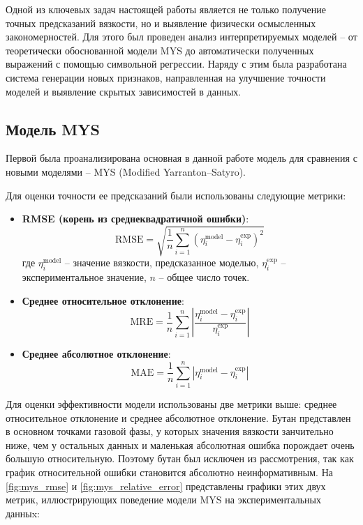 \documentclass[a4paper,12pt]{article}
\begin{document}
  Одной из ключевых задач настоящей работы является не только получение точных предсказаний вязкости, но и выявление физически осмысленных закономерностей. Для этого был проведен анализ интерпретируемых моделей -- от теоретически обоснованной модели MYS до автоматически полученных выражений с помощью символьной регрессии. Наряду с этим была разработана система генерации новых признаков, направленная на улучшение точности моделей и выявление скрытых зависимостей в данных.

  \subsection{Модель MYS}

    Первой была проанализирована основная в данной работе модель для сравнения с новыми моделями -- MYS (Modified Yarranton–Satyro).
    
    Для оценки точности ее предсказаний были использованы следующие метрики:
    
    \begin{itemize}
      \item \textbf{RMSE (корень из среднеквадратичной ошибки)}:
      \begin{equation}
        \mathrm{RMSE} = \sqrt{\frac{1}{n} \sum_{i=1}^{n} \left( \eta_i^{\text{model}} - \eta_i^{\text{exp}} \right)^2}
      \end{equation}
      где \( \eta_i^{\text{model}} \) -- значение вязкости, предсказанное моделью, \( \eta_i^{\text{exp}} \) -- экспериментальное значение, \( n \) -- общее число точек.
    
      \item \textbf{Среднее относительное отклонение}:
      \begin{equation}
        \mathrm{MRE} = \frac{1}{n} \sum_{i=1}^{n} \left| \frac{\eta_i^{\text{model}} - \eta_i^{\text{exp}}}{\eta_i^{\text{exp}}} \right|
      \end{equation}

      \item \textbf{Среднее абсолютное отклонение}:
      \begin{equation}
        \mathrm{MAE} = \frac{1}{n} \sum_{i=1}^{n} \left| \eta_i^{\text{model}} - \eta_i^{\text{exp}} \right|
      \end{equation}
    \end{itemize}
    
    \medskip
    
   Для оценки эффективности модели использованы две метрики выше: среднее относительное отклонение и среднее абсолютное отклонение. Бутан представлен в основном точками газовой фазы, у которых значения вязкости занчительно ниже, чем у остальных данных и маленькая абсолютная ошибка порождает очень большую относительную. Поэтому бутан был исключен из рассмотрения, так как график относительной ошибки становится абсолютно неинформативным. На \autoref{fig:mys_rmse} и \autoref{fig:mys_relative_error} представлены графики этих двух метрик, иллюстрирующих поведение модели MYS на экспериментальных данныx:  
\end{document}
